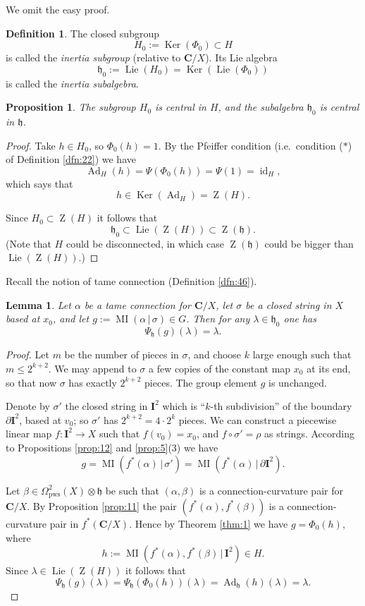 \documentclass[10pt, a4paper]{amsart}
\newtheorem{prop}[equation]{Proposition}
\newtheorem{lem}[equation]{Lemma}
\theoremstyle{definition}
\newtheorem{dfn}[equation]{Definition}
\numberwithin{equation}{section}
\newcommand{\opn}{\operatorname}
\newcommand{\mfrak}[1]{\mathfrak{#1}}
\newcommand{\mbf}[1]{\mathbf{#1}}
\newcommand{\mrm}[1]{\mathrm{#1}}
\renewcommand{\vert}{\, | \,}
\newcommand{\h}{\mfrak{h}}
\begin{document}
We omit the easy proof. 

\begin{dfn}
The closed subgroup
\[ H_0 := \opn{Ker}(\Phi_0) \subset H \]
is called the {\em inertia subgroup} (relative to $\mbf{C} / X$).
Its Lie algebra
\[ \h_0 := \opn{Lie}(H_0) = \opn{Ker}(\opn{Lie}(\Phi_0)) \]
is called the {\em inertia subalgebra}.
\end{dfn}

\begin{prop}
The subgroup $H_0$ is central in $H$, and the subalgebra $\h_0$ is central
in $\h$.
\end{prop}

\begin{proof}
Take $h \in H_0$, so $\Phi_0(h) = 1$. By the Pfeiffer condition (i.e.\
condition ($*$) of Definition \ref{dfn:22}) we have
\[ \opn{Ad}_H(h) = \Psi(\Phi_0(h)) = \Psi(1) = \opn{id}_H , \]
which says that 
\[ h \in \opn{Ker}(\opn{Ad}_H) = \opn{Z}(H) . \]

Since $H_0 \subset  \opn{Z}(H)$ it follows that 
\[ \h_0 \subset \opn{Lie}(\opn{Z}(H)) \subset \opn{Z}(\h) . \]
(Note that $H$ could be disconnected, in which case 
$\opn{Z}(\h)$ could be bigger than
$\opn{Lie}(\opn{Z}(H))$.)
\end{proof}

Recall the notion of tame connection (Definition \ref{dfn:46}).

\begin{lem} \label{lem:45}
Let $\alpha$ be a tame connection for $\mbf{C} / X$, let $\sigma$ be a closed
string in $X$ based at $x_0$, and let
$g := \opn{MI}(\alpha \vert \sigma) \in G$. Then for any
$\lambda \in \h_0$ one has
\[ \Psi_{\h}(g)(\lambda) = \lambda . \]
\end{lem}

\begin{proof} Let $m$ be the number of pieces in $\sigma$, and choose $k$ large
enough such that $m \leq 2^{k+2}$. We may append to $\sigma$ a few
copies of the constant map $x_0$ at its end, so that now $\sigma$ has exactly 
$2^{k+2}$ pieces. The group element $g$ is unchanged. 

Denote by $\sigma'$ the closed string in
$\mbf{I}^2$ which is ``$k$-th subdivision'' of the boundary 
$\partial \mbf{I}^2$, based at $v_0$; so $\sigma'$ has 
$2^{k+2}= 4 \cdot 2^k$ pieces. We can construct a piecewise linear map
$f : \mbf{I}^2 \to X$ such that $f(v_0) = x_0$, and 
$f \circ \sigma' = \rho$ as strings. According to 
Propositions \ref{prop:12} and \ref{prop:5}(3) we have
\[ g = \opn{MI}(f^*(\alpha) \vert \sigma')
= \opn{MI}(f^*(\alpha) \vert \partial \mbf{I}^2)  . \]

Let $\beta \in \Omega^2_{\mrm{pws}}(X) \otimes \h$ be such that 
$(\alpha, \beta)$ is a connection-curvature pair for $\mbf{C} / X$.
By Proposition \ref{prop:11} the pair $(f^*(\alpha), f^*(\beta))$ is a
connection-curvature pair in $f^*(\mbf{C} / X)$.
Hence by Theorem \ref{thm:1} we have
$g = \Phi_0(h)$, where
\[ h := \opn{MI}(f^*(\alpha), f^*(\beta) \vert \mbf{I}^2) \in H . \]
Since $\lambda \in \opn{Lie}(\opn{Z}(H))$ it follows that
\[ \Psi_{\h}(g)(\lambda) = \Psi_{\h}(\Phi_0(h))(\lambda) = 
\opn{Ad}_{\h}(h)(\lambda) = \lambda . \]
\end{proof}
\end{document}
